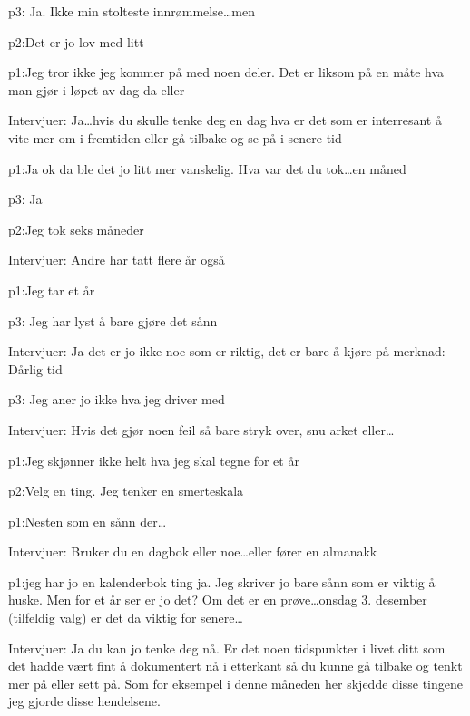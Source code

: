 \documentclass[11pt,UKenglish, a4paper]{article}
\begin{document}
\textcolor{myR} {p3:} Ja. Ikke min stolteste innrømmelse\dots men

\textcolor{myYellow} {p2:}Det er jo lov med litt

\textcolor{myGreen} {p1:}Jeg tror ikke jeg kommer på med noen deler. Det er liksom på en måte hva man gjør i løpet av dag da eller

\textcolor{myBlue} {Intervjuer:} Ja\dots hvis du skulle tenke deg en dag hva er det som er interresant å vite mer om i fremtiden eller gå tilbake og se på i senere tid

\textcolor{myGreen} {p1:}Ja ok da ble det jo litt mer vanskelig. Hva var det du tok\dots en måned

\textcolor{myR} {p3:} Ja

\textcolor{myYellow} {p2:}Jeg tok seks måneder

\textcolor{myBlue} {Intervjuer:} Andre har tatt flere år også 

\textcolor{myGreen} {p1:}Jeg tar et år

\textcolor{myR} {p3:} Jeg har lyst å bare gjøre det sånn

\textcolor{myBlue} {Intervjuer:} Ja det er jo ikke noe som er riktig, det er bare å kjøre på 
merknad: Dårlig tid

\textcolor{myR} {p3:} Jeg aner jo ikke hva jeg driver med

\textcolor{myBlue} {Intervjuer:} Hvis det gjør noen feil så bare stryk over, snu arket eller\dots

\textcolor{myGreen} {p1:}Jeg skjønner ikke helt hva jeg skal tegne for et år

\textcolor{myYellow} {p2:}Velg en ting. Jeg tenker en smerteskala

\textcolor{myGreen} {p1:}Nesten som en sånn der\dots

\textcolor{myBlue} {Intervjuer:} Bruker du en dagbok eller noe\dots eller fører en almanakk


\textcolor{myGreen} {p1:}jeg har jo en kalenderbok ting ja. Jeg skriver jo bare sånn som er viktig å huske. Men for et år ser er jo det? Om det er en prøve\dots onsdag 3. desember (tilfeldig valg) er det da viktig for senere\dots

\textcolor{myBlue} {Intervjuer:} Ja du kan jo tenke deg nå. Er det noen tidspunkter i livet ditt som det hadde vært fint å dokumentert nå i etterkant så du kunne gå tilbake og tenkt mer på eller sett på. Som for eksempel i denne måneden her skjedde disse tingene jeg gjorde disse hendelsene.
\end{document}
